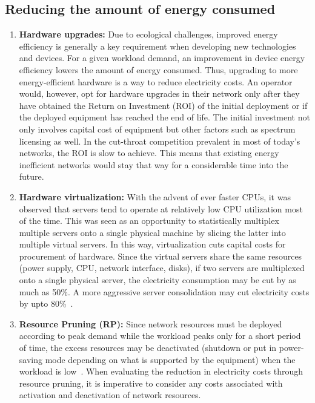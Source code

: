 \subsection{Reducing the amount of energy consumed}
\begin{enumerate}
\item \textbf{Hardware upgrades:} Due to ecological challenges, improved energy efficiency is generally a key requirement when developing new technologies and devices. For a given workload demand, an improvement in device energy efficiency lowers the amount of energy consumed. Thus, upgrading to more energy-efficient hardware is a way to reduce electricity costs. An operator would, however, opt for hardware upgrades in their network only after they have obtained the Return on Investment (ROI) of the initial deployment or if the deployed equipment has reached the end of life. The initial investment not only involves capital cost of equipment but other factors such as spectrum licensing as well. In the cut-throat competition prevalent in most of today's networks, the ROI is slow to achieve. This means that existing energy inefficient networks would stay that way for a considerable time into the future.
\item \textbf{Hardware virtualization:} With the advent of ever faster CPUs, it was observed that servers tend to operate at relatively low CPU utilization most of the time. This was seen as an opportunity to statistically multiplex multiple servers onto a single physical machine by slicing the latter into multiple virtual servers. In this way, virtualization cuts capital costs for procurement of hardware. Since the virtual servers share the same resources (power supply, CPU, network interface, disks), if two servers are multiplexed onto a single physical server, the electricity consumption may be cut by as much as 50\%. A more aggressive server consolidation may cut electricity costs by upto 80\%~\cite{VirtualizationCutsPower}.
\item \textbf{Resource Pruning (RP):} Since network resources must be deployed according to peak demand while the workload peaks only for a short period of time, the excess resources may be deactivated (shutdown or put in power-saving mode depending on what is supported by the equipment) when the workload is low~\cite{Chase:2001:MES:502059.502045,Chen:2008:ESP:1387589.1387613,Meisner:2009:PES:1508244.1508269,Lin_dynamicright-sizing,Peng:2011:BTSSaving:Mobicom}. When evaluating the reduction in electricity costs through resource pruning, it is imperative to consider any costs associated with activation and deactivation of network resources.
\end{enumerate}

